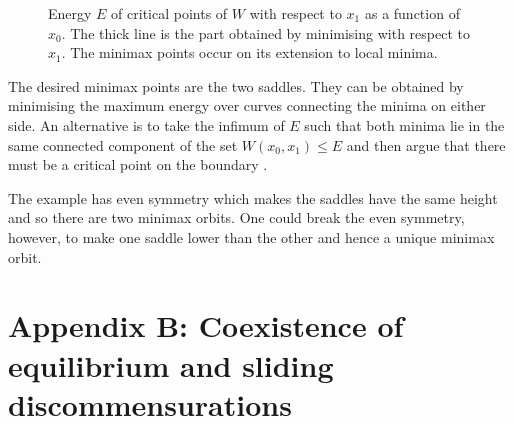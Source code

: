 \documentclass[12pt]{article}
\newcounter{number}
\renewcommand{\thelemma}{\thesection.\thenumber}
\renewcommand{\theequation}{\arabic{section}.\arabic{equation}}
\begin{document}
\begin{figure}[htbp] %
   \centering

   \caption{Energy $E$ of critical points of $W$ with respect to $x_1$ as a function of $x_0$.  The thick line is the part obtained by minimising with respect to $x_1$.  The minimax points occur on its extension to local minima. }
   \label{fig:minimax}
\end{figure}

The desired minimax points are the two saddles.  They can be obtained by minimising the maximum energy over curves connecting the minima on either side.  An alternative is to take the infimum of $E$ such that both minima lie in the same connected component of the set $W(x_0,x_1)\le E$ and then argue that there must be a critical point on the boundary \cite{Mat2}.

The example has even symmetry which makes the saddles have the same height and so there are two minimax orbits.  One could break the even symmetry, however, to make one saddle lower than the other and hence a unique minimax orbit.



\section*{Appendix B: Coexistence of equilibrium and sliding discommensurations } %

 \setcounter{theorem}{0}
 \setcounter{equation}{0}
 \setcounter{lemma}{0}
 \renewcommand{\theequation}{B.\arabic{equation}}
\renewcommand{\thelemma}{B.\arabic{lemma}}
\end{document}
